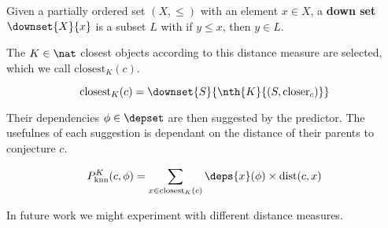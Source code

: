 \begin{definition}\label{def:downset}
  Given a partially ordered set $(X, \leq)$ with an element $x \in X$, a \textbf{down set} $\downset{X}{x}$ is a subset $L$ with if $y \leq x$, then $y \in L$.
\end{definition}

The $K \in \nat$ closest objects according to this distance measure are selected, which we call $\text{closest}_K(c)$.
\begin{definition}
  $$
    \text{closest}_K(c) = \downset{S}{\nth{K}{(S, \text{closer}_c)}}
  $$
\end{definition}

Their dependencies $\phi \in \depset$ are then suggested by the predictor.
The usefulnes of each suggestion is dependant on the distance of their parents to conjecture $c$.
\begin{definition}
  $$
    P^K_\text{knn}(c, \phi) = \sum_{x \in \text{closest}_K(c)} \deps{x}(\phi) \times \text{dist}(c, x)
  $$
\end{definition}

In future work we might experiment with different distance measures.
